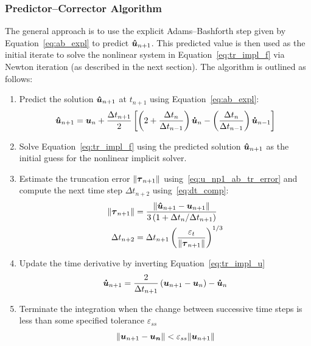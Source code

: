\subsubsection*{Predictor--Corrector Algorithm}
The general approach is to use the explicit Adams--Bashforth step given by Equation~\eqref{eq:ab_expl} to predict ${\boldsymbol{\hat{u}}}_{n+1}$.  This predicted value is then used as the initial iterate to solve the nonlinear system in Equation~\eqref{eq:tr_impl_f} via Newton iteration (as described in the next section).  The algorithm is outlined as follows:
\begin{enumerate}
  \tightlist
  \item Predict the solution ${\boldsymbol{\hat{u}}}_{n+1}$ at $t_{n+1}$ using Equation~\eqref{eq:ab_expl}:
    \begin{equation}
      \nonumber
      {\boldsymbol{\hat{u}}}_{n+1} = {\boldsymbol{u}}_n +
      \frac{\Delta t_{n+1}}{2}\left[\left(2 + \frac{\Delta t_n}{\Delta t_{n-1}}\right){\boldsymbol{\dot{u}}}_n -
        \left(\frac{\Delta t_n}{\Delta t_{n-1}}\right){\boldsymbol{\dot{u}}}_{n-1}\right]
    \end{equation}
  \item Solve Equation~\eqref{eq:tr_impl_f} using the predicted solution ${\boldsymbol{\hat{u}}}_{n+1}$ as the initial guess for the nonlinear implicit solver.

  \item Estimate the truncation error $\|{\boldsymbol{\tau}}_{n+1}\|$ using~\eqref{eq:u_np1_ab_tr_error} and compute the next time step $\Delta t_{n+2}$ using~\eqref{eq:dt_comp}:
    \begin{align}
      \nonumber
      \|{\boldsymbol{\tau}}_{n+1}\| &= \frac{\|{\boldsymbol{\hat{u}}}_{n+1} - {\boldsymbol{u}}_{n+1}\|}{3\left(1 + \Delta t_n/\Delta t_{n+1}\right)} \\
      \nonumber
      \Delta t_{n+2} &= \Delta t_{n+1} \left(\frac{\varepsilon_t}{\| {\boldsymbol{\tau}}_{n+1}\|}\right)^{1/3}
    \end{align}
    
  \item Update the time derivative by inverting Equation~\eqref{eq:tr_impl_u}
    \begin{equation}
      \nonumber
      {\boldsymbol{\dot{u}}}_{n+1} = \frac{2}{\Delta t_{n+1}} \left({\boldsymbol{u}}_{n+1} - {\boldsymbol{u}}_n\right) - {\boldsymbol{\dot{u}}}_n
    \end{equation}

  \item Terminate the integration when the change between successive time steps is less than some
    specified tolerance $\varepsilon_{ss}$
    \begin{equation}
      \label{eq:ss_terminate}
      \|{\boldsymbol{u}}_{n+1} - {\boldsymbol{u_n}}\| < \varepsilon_{ss} \|{\boldsymbol{u}}_{n+1}\|
    \end{equation}
\end{enumerate}


